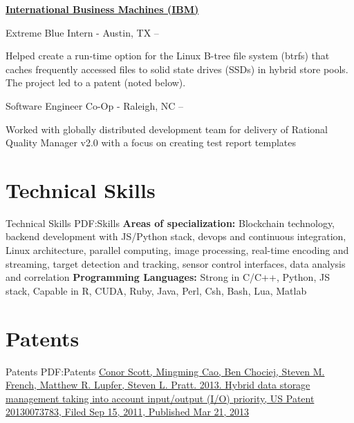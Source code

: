 \documentclass[a4paper,10pt,oneside]{article}
\begin{document}
\begin{minipage}[t][0pt]{\linewidth}
\begin{body}
\EntryGap

\href{www.ibm.com}
{\textbf{International Business Machines (IBM)}}
\par
Extreme Blue Intern - Austin, TX
\hfill
{} --
\begin{detail}
\BulletItem
Helped create a run-time option for the Linux B-tree file system (btrfs) that caches frequently accessed files to solid state drives (SSDs) in hybrid store pools. The project led to a patent (noted below). 
\end{detail}

\par
Software Engineer Co-Op - Raleigh, NC
\hfill
{} --
\begin{detail}
\BulletItem
Worked with globally distributed development team for delivery of Rational Quality Manager v2.0 with a focus on creating test report templates
\end{detail}


\section
{Technical Skills}
{Technical Skills}
{PDF:Skills}
\textbf{Areas of specialization:} Blockchain technology, backend development with JS/Python stack, devops and continuous integration, Linux architecture, parallel computing, image processing, real-time encoding and streaming, target detection and tracking, sensor control interfaces, data analysis and correlation
\newline
\textbf{Programming Languages:} Strong in C/C++, Python, JS stack, Capable in R, CUDA, Ruby, Java, Perl, Csh, Bash, Lua, Matlab


\section
{Patents}
{Patents}
{PDF:Patents}
\href{https://www.google.com/patents/US20130073783}
{Conor Scott, Mingming Cao, Ben Chociej, Steven M. French, Matthew R. Lupfer, Steven L. Pratt. 2013. Hybrid data storage management taking into account input/output (I/O) priority, US Patent 20130073783, Filed Sep 15, 2011, Published Mar 21, 2013 }
\end{body}
\end{minipage}
\label{LastPage}
\end{document}
